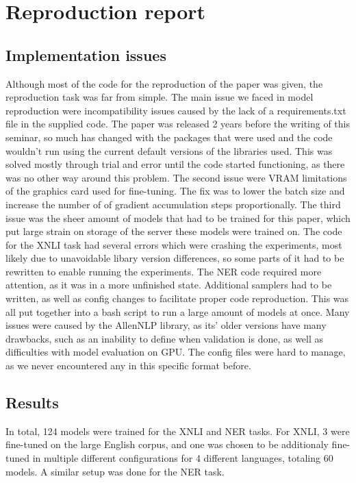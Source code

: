 \documentclass[times, utf8, seminar, english]{fer}
\begin{document}
\chapter[Reproduction report]{Reproduction report}
\section{Implementation issues}
Although most of the code for the reproduction of the paper was given, the reproduction task was far from simple. The main issue we faced in model reproduction were incompatibility issues caused by the lack of a requirements.txt file in the supplied code.  The paper was released 2 years before the writing of this seminar, so much has changed with the packages that were used and the code wouldn't run using the current default versions of the libraries used. This was solved mostly through trial and error until the code started functioning, as there was no other way around this problem. The second issue were VRAM limitations of the graphics card used for fine-tuning. The fix was to lower the batch size and increase the number of of gradient accumulation steps proportionally. The third issue was the sheer amount of models that had to be trained for this paper, which put large strain on storage of the server these models were trained on. The code for the XNLI task had several errors which were crashing the experiments, most likely due to unavoidable libary version differences, so some parts of it had to be rewritten to enable running the experiments. The NER code required more attention, as it was in a more unfinished state. Additional samplers had to be written, as well as config changes to facilitate proper code reproduction. This was all put together into a bash script to run a large amount of models at once. Many issues were caused by the AllenNLP library, as its' older versions have many drawbacks, such as an inability to define when validation is done, as well as difficulties with model evaluation on GPU. The config files were hard to manage, as we never encountered any in this specific format before.

\section{Results}
In total, 124 models were trained for the XNLI and NER tasks. For XNLI, 3 were fine-tuned on the large English corpus, and one was chosen to be additionaly fine-tuned in multiple different configurations for 4 different languages, totaling 60 models. A similar setup was done for the NER task.
\end{document}
